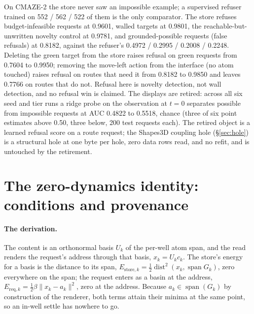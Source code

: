\documentclass{article}
\begin{document}
On CMAZE-2 the store never saw an impossible example; a supervised refuser trained on 552 / 562 /
522 of them is the only comparator. The store refuses budget-infeasible requests at 0.9601, walled
targets at 0.9801, the reachable-but-unwritten novelty control at 0.9781, and grounded-possible
requests (false refusals) at 0.8182, against the refuser's 0.4972 / 0.2995 / 0.2008 / 0.2248.
Deleting the green target from the store raises refusal on green requests from 0.7604 to 0.9950;
removing the move-left action from the interface (no atom touched) raises refusal on routes that
need it from 0.8182 to 0.9850 and leaves 0.7766 on routes that do not.
Refusal here is novelty detection, not wall detection, and no refusal win is claimed. The displays
are retired: across all six seed and tier runs a ridge probe on the observation at $t=0$ separates
possible from impossible requests at AUC 0.4822 to 0.5518, chance (three of six point estimates above 0.50, three below, 200 test requests each). The retired object is a learned
refusal score on a route request; the Shapes3D coupling hole (\S\ref{sec:hole}) is a structural
hole at one byte per hole, zero data rows read, and no refit, and is untouched by the retirement.

\section{The zero-dynamics identity: conditions and provenance}
\label{app:clue}

\paragraph{The derivation.} The content is an orthonormal basis $U_k$ of the
per-well atom span, and the read renders the request's address through that basis,
$x_k=U_k c_k$. The store's energy for a basis is the distance to its span,
$E_{\text{store},k}=\tfrac12\operatorname{dist}^2(x_k,\operatorname{span}G_k)$, zero everywhere
on the span; the request enters as a basin at the address, $E_{\text{req},k}=\tfrac12\beta\lVert
x_k-a_k\rVert^2$, zero at the address. Because $a_k\in\operatorname{span}(G_k)$ by construction
of the renderer, both terms attain their minima at the same point, so an in-well settle has
nowhere to go. 
\end{document}
